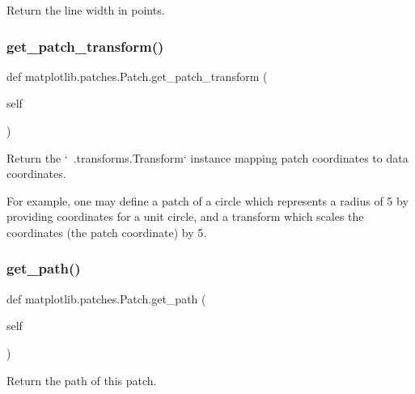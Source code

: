 \begin{DoxyVerb}Return the line width in points.\end{DoxyVerb}
 \mbox{\label{classmatplotlib_1_1patches_1_1Patch_a2d7aa6feda4757cbf2eb366384f925db}} 
\subsubsection{\texorpdfstring{get\+\_\+patch\+\_\+transform()}{get\_patch\_transform()}}
{\footnotesize\ttfamily def matplotlib.\+patches.\+Patch.\+get\+\_\+patch\+\_\+transform (\begin{DoxyParamCaption}\item[{}]{self }\end{DoxyParamCaption})}

\begin{DoxyVerb}Return the `~.transforms.Transform` instance mapping patch coordinates
to data coordinates.

For example, one may define a patch of a circle which represents a
radius of 5 by providing coordinates for a unit circle, and a
transform which scales the coordinates (the patch coordinate) by 5.
\end{DoxyVerb}
 \mbox{\label{classmatplotlib_1_1patches_1_1Patch_a1a7fa55fe4563415e4010be08946c1f1}} 
\subsubsection{\texorpdfstring{get\+\_\+path()}{get\_path()}}
{\footnotesize\ttfamily def matplotlib.\+patches.\+Patch.\+get\+\_\+path (\begin{DoxyParamCaption}\item[{}]{self }\end{DoxyParamCaption})}

\begin{DoxyVerb}Return the path of this patch.\end{DoxyVerb}
 \mbox{\label{classmatplotlib_1_1patches_1_1Patch_af080d5a2f69c8b9dca63821c6cbae121}} 
